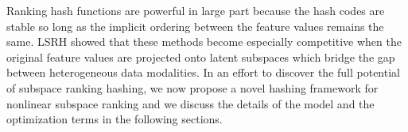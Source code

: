 \documentclass[letterpaper]{article}
\newcommand{\argmax}{\operatornamewithlimits{argmax}}
\begin{document}
Ranking hash functions are powerful in large part because the hash codes are stable so long as the implicit ordering between the feature values remains the same. LSRH showed that these methods become especially competitive when the original feature values are projected onto latent subspaces which bridge the gap between heterogeneous data modalities. In an effort to discover the full potential of subspace ranking hashing, we now propose a novel hashing framework for nonlinear subspace ranking and we discuss the details of the model and the optimization terms in the following sections.

\begin{comment}

As given in \cite{kai}, (\ref{eq:hfun}) can be reformulated to the vectorized form in (\ref{eq:hfunvec}):

\begin{equation}
\label{eq:hfunvec}
\begin{gathered}
h(\mathbf{z}; \mathbf{W}) = \argmax\limits_{\mathbf{g}} \mathbf{g}^T \mathbf{Wz}, \\
\text{s.t.} \enspace \mathbf{g} \in \{0,1\}^K, \mathbf{1}^T\mathbf{g} = 1
\end{gathered}
\end{equation}

In order to optimize the parameters $ \mathbf{W} $, LSRH proposes to use the softmax function as a continuous probabilistic approximation for the argmax term. Thus for the training phase, the hash function is approximated by (\ref{eq:hfunsoft}), where $ \sigma $ denotes the softmax activation function. During retrieval, which requires computation of the Hamming distance between two codes, (\ref{eq:hfun}) is still utilized.

\begin{equation}
\label{eq:hfunsoft}
h(\mathbf{z}; \mathbf{W}) \approx \sigma(\mathbf{Wz})
\end{equation}

Although LSRH showed significant improvements over traditional non-ranking hashing methods, the use of strictly linear subspaces prevents the optimality that may be achieved [TODO reword- introduction is the same wording] by exploiting the nonlinearities of deep neural networks. Additionally, while LSRH is restricted to learning one hash code bit function at a time using Adaboost, our proposed method is able to learn all bits simultaneously. In general, this can reduce training time while additionally eliminating the dependence of later hash functions on previously learned hash functions.

\end{comment}
\end{document}
